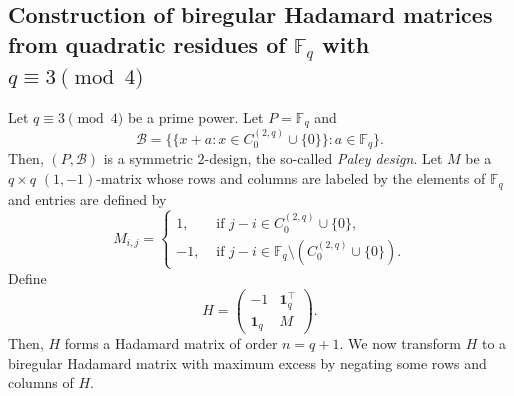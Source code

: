 \documentclass[10pt]{amsart}
\theoremstyle{definition}
\newcommand*\F{{\mathbb F}}
\newcommand*\tra{\top}
\newcommand*{\un}{\mathbf{1}}
\begin{document}
\subsection{Construction of biregular Hadamard matrices from quadratic residues of \texorpdfstring{$\F_q$}{Fq} with \texorpdfstring{$q\equiv 3\pmod{4}$}{q = 3 (mod 4)}}\label{sec:4.1}

Let $q\equiv 3\pmod{4}$ be a prime power. Let $P=\F_q$ and
\begin{equation}\label{eq:desquad}
{\mathcal B}=\{\{x+a:x \in C_0^{(2,q)}\cup \{0\}\}:a \in \F_q\}.
\end{equation}
Then, $(P,{\mathcal B})$ is a symmetric $2$-design, the so-called \emph{Paley design}. Let $M$ be a $q\times q$ $(1,-1)$-matrix whose rows and columns are labeled by the elements of $\F_q$ and entries are defined by
\[
M_{i,j}=
\begin{cases}
1,& \text{ if } j-i\in C_0^{(2,q)} \cup \{0\},\\
-1,& \text{ if } j-i\in \F_q\setminus (C_0^{(2,q)} \cup \{0\}).
\end{cases}
\]
Define
\begin{equation}\label{eq:conf}
H=
\begin{pmatrix} -1 & \un_q^\tra \\ \un_q & M
\end{pmatrix}.
\end{equation}
Then, $H$ forms a Hadamard matrix of order $n=q+1$. We now transform $H$ to a biregular Hadamard matrix with maximum excess by negating some rows and columns of $H$.
\end{document}
